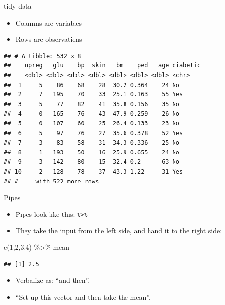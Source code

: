 \documentclass[
  ignorenonframetext,
]{beamer}
\newenvironment{Shaded}{\begin{snugshade}}{\end{snugshade}}
\newcommand{\DecValTok}[1]{\textcolor[rgb]{0.00,0.00,0.81}{#1}}
\newcommand{\FunctionTok}[1]{\textcolor[rgb]{0.00,0.00,0.00}{#1}}
\newcommand{\NormalTok}[1]{#1}
\newcommand{\SpecialCharTok}[1]{\textcolor[rgb]{0.00,0.00,0.00}{#1}}
\providecommand{\tightlist}{%
  \setlength{\itemsep}{0pt}\setlength{\parskip}{0pt}}
\begin{document}
\begin{frame}[fragile]{tidy data}
\protect\hypertarget{tidy-data}{}
\begin{itemize}
\tightlist
\item
  Columns are variables
\item
  Rows are observations
\end{itemize}

\begin{verbatim}
## # A tibble: 532 x 8
##    npreg   glu    bp  skin   bmi   ped   age diabetic
##    <dbl> <dbl> <dbl> <dbl> <dbl> <dbl> <dbl> <chr>   
##  1     5    86    68    28  30.2 0.364    24 No      
##  2     7   195    70    33  25.1 0.163    55 Yes     
##  3     5    77    82    41  35.8 0.156    35 No      
##  4     0   165    76    43  47.9 0.259    26 No      
##  5     0   107    60    25  26.4 0.133    23 No      
##  6     5    97    76    27  35.6 0.378    52 Yes     
##  7     3    83    58    31  34.3 0.336    25 No      
##  8     1   193    50    16  25.9 0.655    24 No      
##  9     3   142    80    15  32.4 0.2      63 No      
## 10     2   128    78    37  43.3 1.22     31 Yes     
## # ... with 522 more rows
\end{verbatim}
\end{frame}

\begin{frame}[fragile]{Pipes}
\protect\hypertarget{pipes}{}
\begin{itemize}
\item
  Pipes look like this: \texttt{\%\textgreater{}\%}
\item
  They take the input from the left side, and hand it to the right side:
\end{itemize}

\begin{Shaded}
\begin{Highlighting}[]
\FunctionTok{c}\NormalTok{(}\DecValTok{1}\NormalTok{,}\DecValTok{2}\NormalTok{,}\DecValTok{3}\NormalTok{,}\DecValTok{4}\NormalTok{) }\SpecialCharTok{\%\textgreater{}\%}\NormalTok{ mean}
\end{Highlighting}
\end{Shaded}

\begin{verbatim}
## [1] 2.5
\end{verbatim}

\begin{itemize}
\item
  Verbalize as: ``and then''.
\item
  ``Set up this vector and then take the mean''.
\end{itemize}
\end{frame}
\end{document}
